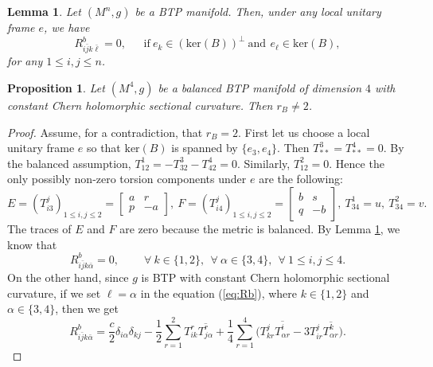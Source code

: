 \documentclass[10pt,a4paper]{amsart}
\newtheorem{lemma}{Lemma}
\newtheorem{proposition}{Proposition}
\begin{document}
\begin{lemma} \label{lemmakernelB}
Let $(M^n,g)$ be a BTP manifold. Then, under any local unitary frame $e$, we have
\begin{equation} \label{eq:kernelB}
 R^b_{i\bar{j}k\bar{\ell}} = 0,  \ \ \ \ \ \ \ \mbox{if} \ e_k\in (\mbox{ker}(B))^{\perp} \  \mbox{and} \ \,e_{\ell} \in \mbox{ker}(B),
\end{equation}
for any $1\leq i,j\leq n$.
\end{lemma}

\begin{proposition} \label{proprank2}
Let $(M^4,g)$ be a balanced BTP manifold of dimension $4$ with constant Chern holomorphic sectional curvature. Then $r_B\neq 2$.
\end{proposition}

\begin{proof}
Assume, for a contradiction, that $r_B=2$. First let us choose a local unitary frame $e$ so that $\mbox{ker}(B)$ is spanned by $\{ e_3, e_4\}$. Then $T^3_{\ast \ast} = T^4_{\ast \ast}=0$. By the balanced assumption, $T^1_{12}=-T^3_{32}-T^4_{42}=0$. Similarly, $T^2_{12}=0$. Hence the only possibly non-zero torsion components under $e$ are the following:
\begin{equation} \label{eq:rank2}
E = (T^j_{i3})_{1\leq i,j\leq 2} = \left[ \begin{array}{cc} a & r\\p& -a \end{array} \right] , \ F = (T^j_{i4})_{1\leq i,j\leq 2} = \left[ \begin{array}{cc} b & s\\q& -b \end{array} \right],\ T^1_{34}=u, \ T^2_{34}=v.
\end{equation}
The traces of $E$ and $F$ are zero because the metric is balanced. By Lemma \ref{lemmakernelB}, we know that
\begin{equation} \label{eq:rank2a}
R^{b}_{i\bar{j}k\bar{\alpha}} =0,  \ \ \ \ \ \ \ \ \ \ \forall \ k\in \{ 1,2\}, \ \ \forall \ \alpha \in \{ 3,4\}, \ \  \forall \ 1\leq i,j \leq 4.
\end{equation}
On the other hand, since $g$ is BTP with constant Chern holomorphic sectional curvature, if we set \(\ell=\alpha\) in the equation (\ref{eq:Rb}), where \(k\in\{1,2\}\) and \(\alpha\in\{3,4\}\), then we get
\begin{equation} \label{eq:rank2b}
R^{b}_{i\bar{j}k\bar{\alpha}} = \frac{c}{2} \delta_{i\alpha} \delta_{kj} -\frac{1}{2} \sum_{r=1}^2 T^r_{ik}\overline{T^r_{j\alpha}}  + \frac{1}{4} \sum_{r=1}^4 \big( T^j_{kr}\overline{T^i_{\alpha r}} - 3 T^j_{ir}\overline{T^k_{\alpha r}} \big).

\end{equation}
\end{proof}
\end{document}
